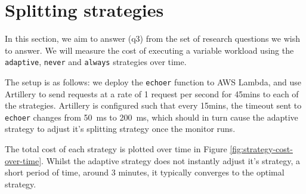 
\section{Splitting strategies}
In this section, we aim to answer (q3) from the set of research questions we wish to answer. We will measure the cost of executing a variable workload using the \verb|adaptive|, \verb|never| and \verb|always| strategies over time.

The setup is as follows: we deploy the \verb|echoer| function to AWS Lambda, and use Artillery\cite{artilleryArtilleryCloudscaleLoad} to send requests at a rate of 1 request per second for 45mins to each of the strategies. Artillery is configured such that every 15mins, the timeout sent to \verb|echoer| changes from \SI{50}{\milli\second} to \SI{200}{\milli\second}, which should in turn cause the adaptive strategy to adjust it's splitting strategy once the monitor runs.

The total cost of each strategy is plotted over time in Figure \ref{fig:strategy-cost-over-time}. Whilst the adaptive strategy does not instantly adjust it's strategy, a short period of time, around 3 minutes, it typically converges to the optimal strategy.

\begin{figure*}
    \begin{center}
        
    \end{center}
    \caption{Strategy cost over time.}
    \label{fig:strategy-cost-over-time}
\end{figure*}

\begin{figure*}
    \begin{center}
        
    \end{center}
    \caption{Strategy cost over time.}
    \label{fig:strategy-decision-over-time}
\end{figure*}


%        

